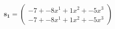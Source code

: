 \documentclass[preview]{standalone}
\begin{document}
\begin{align*}
\mathbf{s_1} = \begin{pmatrix}-7 + -8x^{1} + 1x^{2} + -5x^{3} \\ -7 + -8x^{1} + 1x^{2} + -5x^{3}\end{pmatrix}
\end{align*}
\end{document}
